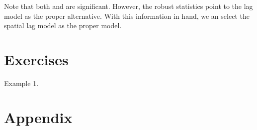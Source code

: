 \documentclass[english,12pt]{book}\usepackage[]{graphicx}\usepackage[]{xcolor}
\begin{document}
Note that both  and  are significant. However, the robust statistics point to the lag model as the proper alternative. With this information in hand, we an select the spatial lag model as the proper model. 

\section{Exercises}

\begin{exercises}
    \exercise Example 1. 
\end{exercises}    
    

\section*{Appendix}
\end{document}
